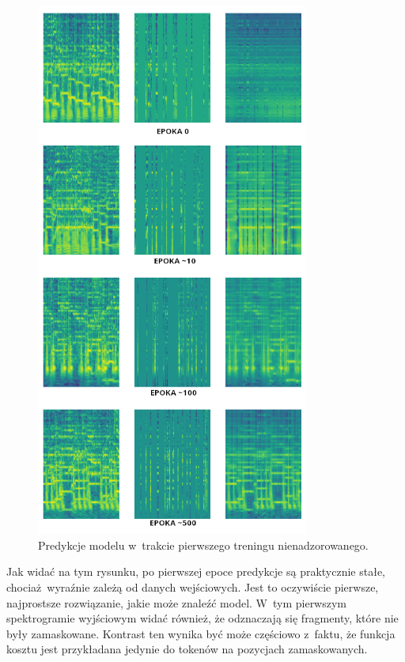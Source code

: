 \begin{figure}
    \centering
    \includegraphics[width=0.8\textwidth]{./images/mae1_predictions.png}
    \caption{Predykcje modelu w~trakcie pierwszego treningu nienadzorowanego.}
    \label{fig:mae1_predictions}
\end{figure}

Jak widać na tym rysunku, po pierwszej epoce predykcje są praktycznie stałe, chociaż wyraźnie zależą od danych wejściowych. Jest to oczywiście pierwsze, najprostsze rozwiązanie, jakie może znaleźć model. W~tym pierwszym spektrogramie wyjściowym widać również, że odznaczają się fragmenty, które nie były zamaskowane. Kontrast ten wynika być może częściowo z~faktu, że funkcja kosztu jest przykładana jedynie do tokenów na pozycjach zamaskowanych.

